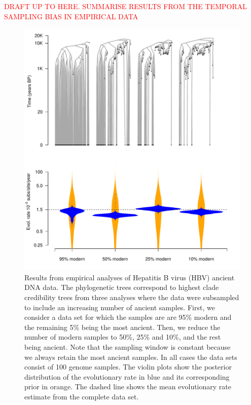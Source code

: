 \documentclass[11pt]{article}
\begin{document}
\textcolor{red}{DRAFT UP TO HERE. SUMMARISE RESULTS FROM THE TEMPORAL SAMPLING BIAS IN EMPIRICAL DATA}

\begin{figure}[H]
    \begin{center}
        \includegraphics[scale=0.7, angle=0]{empirical_results_biased.pdf}
        \caption{Results from empirical analyses of Hepatitis B virus (HBV) ancient DNA data. The phylogenetic trees correspond to highest clade credibility trees from three analyses where the data were subsampled to include an increasing number of ancient samples. First, we consider a data set for which the samples are are 95\% modern and the remaining 5\% being the most ancient. Then, we reduce the number of modern samples to 50\%, 25\% and 10\%, and the rest being ancient. Note that the sampling window is constant because we always retain the most ancient samples. In all cases the data sets consist of 100 genome samples. The violin plots show the posterior distribution of the evolutionary rate in blue and its corresponding prior in orange. The dashed line shows the mean evolutionary rate estimate from the complete data set.}
        \label{figure:Fig6}
    \end{center}
\end{figure}
\end{document}

